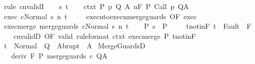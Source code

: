 \begin{isabellebody}
%
\endisadelimproof
%
\isatagproof
{}\isamarkupfalse%
\ {\isacharparenleft}rule\ cnvalidI{\isacharparenright}\isanewline
\ \ \isamarkupfalse%
\ s\ t\isanewline
\ \ \isamarkupfalse%
\ ctxt{\isacharcolon}\ {\isachardoublequoteopen}{\isasymforall}{\isacharparenleft}P{\isacharcomma}\ p{\isacharcomma}\ Q{\isacharcomma}\ A{\isacharparenright}{\isasymin}{\isasymTheta}{\isachardot}\ {\isasymGamma}{\isasymTurnstile}n{\isacharcolon}\isactrlbsub {\isacharslash}F\isactrlesub \ P\ {\isacharparenleft}Call\ p{\isacharparenright}\ Q{\isacharcomma}A{\isachardoublequoteclose}\ \isanewline
\ \ \isamarkupfalse%
\ exec{\isacharcolon}\ {\isachardoublequoteopen}{\isasymGamma}{\isasymturnstile}{\isasymlangle}c{\isacharcomma}Normal\ s{\isasymrangle}\ {\isacharequal}n{\isasymRightarrow}\ t{\isachardoublequoteclose}\ \isanewline
\ \ \isamarkupfalse%
\ execn{\isacharunderscore}to{\isacharunderscore}execn{\isacharunderscore}merge{\isacharunderscore}guards\ {\isacharbrackleft}OF\ exec{\isacharbrackright}\ \isanewline
\ \ \isamarkupfalse%
\ exec{\isacharunderscore}merge{\isacharcolon}\ {\isachardoublequoteopen}{\isasymGamma}{\isasymturnstile}{\isasymlangle}merge{\isacharunderscore}guards\ c{\isacharcomma}Normal\ s{\isasymrangle}\ {\isacharequal}n{\isasymRightarrow}\ t{\isachardoublequoteclose}\isacommand{{\isachardot}}\isamarkupfalse%
\isanewline
\ \ \isamarkupfalse%
\ P{\isacharcolon}\ {\isachardoublequoteopen}s\ {\isasymin}\ P{\isachardoublequoteclose}\ \isanewline
\ \ \isamarkupfalse%
\ t{\isacharunderscore}notin{\isacharunderscore}F{\isacharcolon}\ {\isachardoublequoteopen}t\ {\isasymnotin}\ Fault\ {\isacharbackquote}\ F{\isachardoublequoteclose}\isanewline
\ \ \isamarkupfalse%
\ cnvalidD\ {\isacharbrackleft}OF\ valid\ {\isacharbrackleft}rule{\isacharunderscore}format{\isacharbrackright}\ ctxt\ exec{\isacharunderscore}merge\ P\ t{\isacharunderscore}notin{\isacharunderscore}F{\isacharbrackright}\isanewline
\ \ \isamarkupfalse%
\ {\isachardoublequoteopen}t\ {\isasymin}\ Normal\ {\isacharbackquote}\ Q\ {\isasymunion}\ Abrupt\ {\isacharbackquote}\ A{\isachardoublequoteclose}\isacommand{{\isachardot}}\isamarkupfalse%
\isanewline
{}\isamarkupfalse%
%
\endisatagproof
{\isafoldproof}%
%
\isadelimproof
\isanewline
%
\endisadelimproof
\isanewline
{}\isamarkupfalse%
\ MergeGuardsD{\isacharcolon}\ \isanewline
\ \ \ deriv{\isacharcolon}\ {\isachardoublequoteopen}{\isasymGamma}{\isacharcomma}{\isasymTheta}{\isasymturnstile}\isactrlbsub {\isacharslash}F\isactrlesub \ P\ merge{\isacharunderscore}guards\ c\ Q{\isacharcomma}A{\isachardoublequoteclose}\isanewline

\end{isabellebody}
